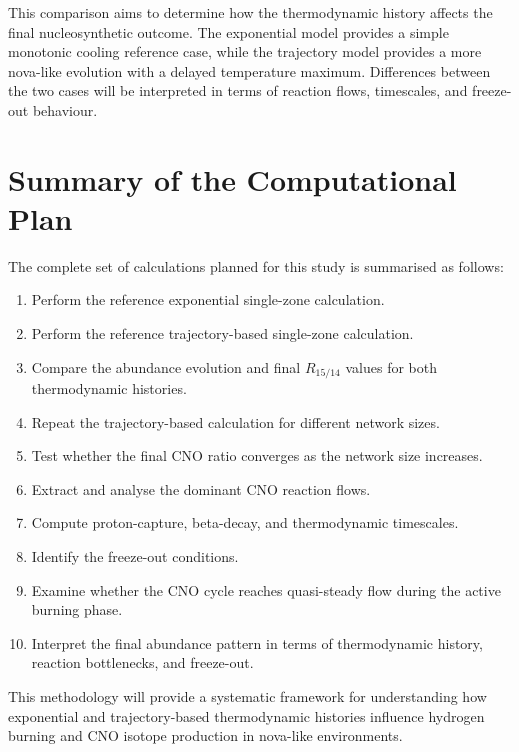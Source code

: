 This comparison aims to determine how the thermodynamic history affects the final nucleosynthetic outcome. The exponential model provides a simple monotonic cooling reference case, while the trajectory model provides a more nova-like evolution with a delayed temperature maximum. Differences between the two cases will be interpreted in terms of reaction flows, timescales, and freeze-out behaviour.
\section{Summary of the Computational Plan}

The complete set of calculations planned for this study is summarised as follows:

\begin{enumerate}
    \item Perform the reference exponential single-zone calculation.
    \item Perform the reference trajectory-based single-zone calculation.
    \item Compare the abundance evolution and final $R_{15/14}$ values for both thermodynamic histories.
    \item Repeat the trajectory-based calculation for different network sizes.
    \item Test whether the final CNO ratio converges as the network size increases.
    \item Extract and analyse the dominant CNO reaction flows.
    \item Compute proton-capture, beta-decay, and thermodynamic timescales.
    \item Identify the freeze-out conditions.
    \item Examine whether the CNO cycle reaches quasi-steady flow during the active burning phase.
    \item Interpret the final abundance pattern in terms of thermodynamic history, reaction bottlenecks, and freeze-out.
\end{enumerate}

This methodology will provide a systematic framework for understanding how exponential and trajectory-based thermodynamic histories influence hydrogen burning and CNO isotope production in nova-like environments.